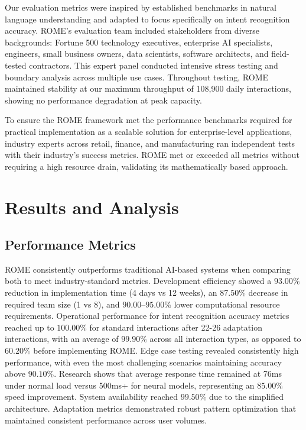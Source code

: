 \documentclass[12pt]{article}
\begin{document}
Our evaluation metrics were inspired by established benchmarks in natural language understanding \cite{zhang2021} and adapted to focus specifically on intent recognition accuracy. ROME's evaluation team included stakeholders from diverse backgrounds: Fortune 500 technology executives, enterprise AI specialists, engineers, small business owners, data scientists, software architects, and field-tested contractors. This expert panel conducted intensive stress testing and boundary analysis across multiple use cases. Throughout testing, ROME maintained stability at our maximum throughput of 108,900 daily interactions, showing no performance degradation at peak capacity.

To ensure the ROME framework met the performance benchmarks required for practical implementation as a scalable solution for enterprise-level applications, industry experts across retail, finance, and manufacturing ran independent tests with their industry's success metrics. ROME met or exceeded all metrics without requiring a high resource drain, validating its mathematically based approach.


\section{Results and Analysis}

\subsection{Performance Metrics}
ROME consistently outperforms traditional AI-based systems when comparing both to meet industry-standard metrics. Development efficiency showed a $93.00\%$ reduction in implementation time (4 days vs 12 weeks), an $87.50\%$ decrease in required team size (1 vs 8), and $90.00$--$95.00\%$ lower computational resource requirements. Operational performance for intent recognition accuracy metrics reached up to $100.00\%$ for standard interactions after 22-26 adaptation interactions, with an average of $99.90\%$ across all interaction types, as opposed to $60.20\%$ before implementing ROME. Edge case testing revealed consistently high performance, with even the most challenging scenarios maintaining accuracy above $90.10\%$. Research shows that average response time remained at 76ms under normal load versus 500ms+ for neural models, representing an $85.00\%$ speed improvement. System availability reached $99.50\%$ due to the simplified architecture. Adaptation metrics demonstrated robust pattern optimization that maintained consistent performance across user volumes.
\end{document}
